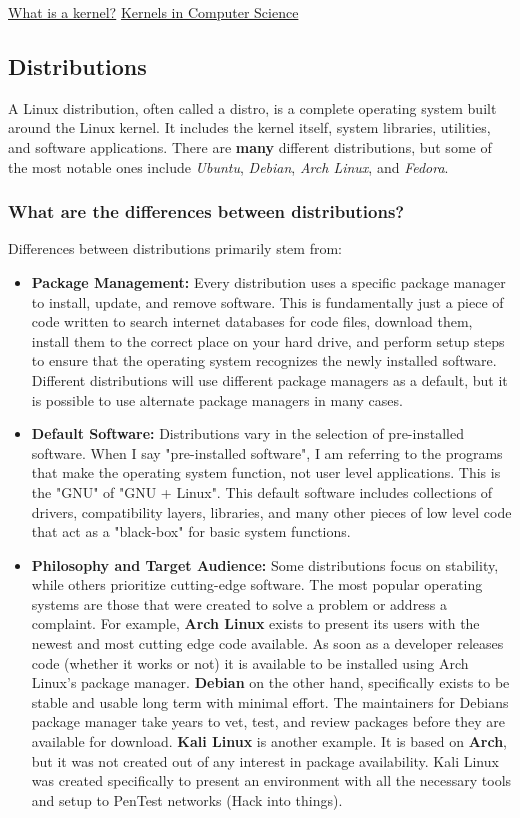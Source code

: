 \documentclass[11pt]{article}
\begin{document}
\href{https://www.geeksforgeeks.org/kernel-in-operating-system/}{What is a kernel?}
\href{https://www.baeldung.com/cs/os-kernel}{Kernels in Computer Science}

\subsection{Distributions}
\label{sec:org615b51f}
A Linux distribution, often called a distro, is a complete operating system built around the Linux kernel. It includes the kernel itself, system libraries, utilities, and software applications. There are \textbf{many} different distributions, but some of the most notable ones include \emph{Ubuntu}, \emph{Debian}, \emph{Arch Linux}, and \emph{Fedora}.

\subsubsection{What are the differences between distributions?}
\label{sec:org6ef867c}
Differences between distributions primarily stem from:
\begin{itemize}
\item \textbf{\textbf{Package Management:}} Every distribution uses a specific package manager to install, update, and remove software. This is fundamentally just a piece of code written to search internet databases for code files, download them, install them to the correct place on your hard drive, and perform setup steps to ensure that the operating system recognizes the newly installed software. Different distributions will use different package managers as a default, but it is possible to use alternate package managers in many cases.
\item \textbf{\textbf{Default Software:}} Distributions vary in the selection of pre-installed software. When I say "pre-installed software", I am referring to the programs that make the operating system function, not user level applications. This is the "GNU" of "GNU + Linux". This default software includes collections of drivers, compatibility layers, libraries, and many other pieces of low level code that act as a "black-box" for basic system functions.
\item \textbf{\textbf{Philosophy and Target Audience:}} Some distributions focus on stability, while others prioritize cutting-edge software. The most popular operating systems are those that were created to solve a problem or address a complaint. For example, \textbf{Arch Linux} exists to present its users with the newest and most cutting edge code available. As soon as a developer releases code (whether it works or not) it is available to be installed using Arch Linux's package manager. \textbf{Debian} on the other hand, specifically exists to be stable and usable long term with minimal effort. The maintainers for Debians package manager take years to vet, test, and review packages before they are available for download. \textbf{Kali Linux} is another example. It is based on \textbf{Arch}, but it was not created out of any interest in package availability. Kali Linux was created specifically to present an environment with all the necessary tools and setup to PenTest networks (Hack into things).
\end{itemize}
\end{document}
